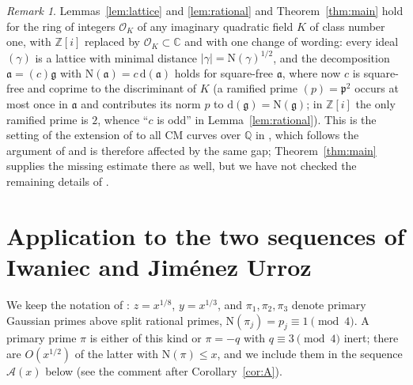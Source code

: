 \documentclass[11pt]{amsart}
\theoremstyle{remark}
\newtheorem{remark}[theorem]{Remark}
\newcommand{\Z}{\mathbb{Z}}
\newcommand{\Q}{\mathbb{Q}}
\newcommand{\C}{\mathbb{C}}
\newcommand{\N}{\mathrm{N}}
\newcommand{\fa}{\mathfrak{a}}
\newcommand{\fg}{\mathfrak{g}}
\newcommand{\fp}{\mathfrak{p}}
\newcommand{\dd}{\mathrm{d}}
\begin{document}
\begin{remark}\label{rem:classnumber}
Lemmas~\ref{lem:lattice} and \ref{lem:rational} and Theorem~\ref{thm:main} hold for the ring of integers $\mathcal O_K$ of any imaginary quadratic field $K$ of class number one, with $\Z[i]$ replaced by $\mathcal O_K\subset\C$ and with one change of wording: every ideal $(\gamma)$ is a lattice with minimal distance $|\gamma|=\N(\gamma)^{1/2}$, and the decomposition $\fa=(c)\fg$ with $\N(\fa)=c\,\dd(\fa)$ holds for square-free $\fa$, where now $c$ is square-free and coprime to the discriminant of $K$ (a ramified prime $(p)=\fp^2$ occurs at most once in $\fa$ and contributes its norm $p$ to $\dd(\fg)=\N(\fg)$; in $\Z[i]$ the only ramified prime is $2$, whence ``$c$ is odd'' in Lemma~\ref{lem:rational}). This is the setting of the extension of \cite{IJU} to all CM curves over $\Q$ in \cite{JU}, which follows the argument of \cite{IJU} and is therefore affected by the same gap; Theorem~\ref{thm:main} supplies the missing estimate there as well, but we have not checked the remaining details of \cite{JU}.
\end{remark}

\section{Application to the two sequences of Iwaniec and Jim\'enez Urroz}\label{sec:appl}

We keep the notation of \cite{IJU}: $z=x^{1/8}$, $y=x^{1/3}$, and $\pi_1,\pi_2,\pi_3$ denote primary Gaussian primes above split rational primes, $\N(\pi_j)=p_j\equiv 1\pmod 4$. A primary prime $\pi$ is either of this kind or $\pi=-q$ with $q\equiv 3\pmod 4$ inert; there are $O(x^{1/2})$ of the latter with $\N(\pi)\le x$, and we include them in the sequence $\mathcal A(x)$ below (see the comment after Corollary~\ref{cor:A}).
\end{document}
